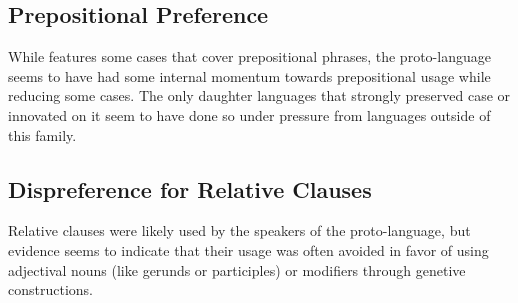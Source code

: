 \subsection{Prepositional Preference}
While \langname features some cases that cover prepositional phrases, the proto-language seems to have had some internal momentum towards prepositional usage while reducing some cases. The only daughter languages that strongly preserved case or innovated on it seem to have done so under pressure from languages outside of this family.
\subsection{Dispreference for Relative Clauses}
Relative clauses were likely used by the speakers of the proto-language, but evidence seems to indicate that their usage was often avoided in favor of using adjectival nouns (like gerunds or participles) or modifiers through genetive constructions. 
